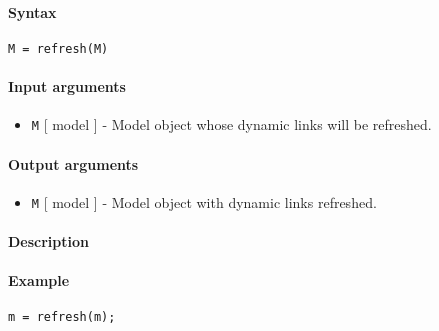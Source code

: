 


	\paragraph{Syntax}

\begin{verbatim}
M = refresh(M)
\end{verbatim}

\paragraph{Input arguments}

\begin{itemize}
\itemsep1pt\parskip0pt
\item
  \texttt{M} {[} model {]} - Model object whose dynamic links will be
  refreshed.
\end{itemize}

\paragraph{Output arguments}

\begin{itemize}
\itemsep1pt\parskip0pt
\item
  \texttt{M} {[} model {]} - Model object with dynamic links refreshed.
\end{itemize}

\paragraph{Description}

\paragraph{Example}

\begin{verbatim}
m = refresh(m);
\end{verbatim}


